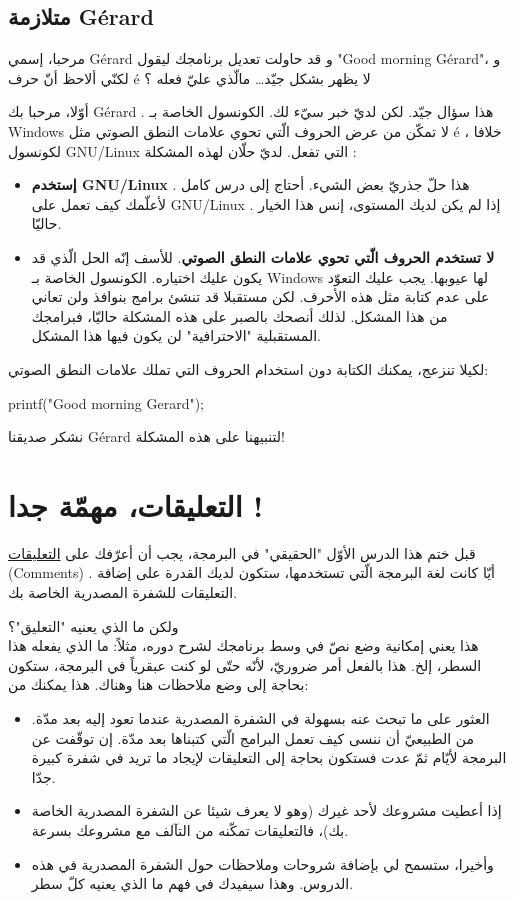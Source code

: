 \subsection{متلازمة \textenglish{Gérard}}
\begin{question}
  مرحبا، إسمي
\textenglish{Gérard}
و قد حاولت تعديل برنامجك ليقول
"\textenglish{Good morning Gérard}"،
و لكنّي ألاحظ أنّ حرف
\textenglish{é}
 لا يظهر بشكل جيّد… مالّذي عليّ فعله ؟
\end{question}
أوّلا، مرحبا بك
\textenglish{Gérard}
. هذا سؤال جيّد. لكن لديّ خبر سيّء لك. الكونسول الخاصة بـ
\textenglish{Windows}
لا تمكّن من عرض الحروف الّتي تحوي علامات النطق الصوتي مثل
\textenglish{é}
، خلافا لكونسول
\textenglish{GNU/Linux}
التي تفعل. لديّ حلّان لهذه المشكلة :
\begin{itemize}
  \item \textbf{إستخدم
\textenglish{GNU/Linux}}
. هذا حلّ جذريّ بعض الشيء. أحتاج إلى درس كامل لأعلّمك كيف تعمل على
\textenglish{GNU/Linux}
. إذا لم يكن لديك المستوى، إنس هذا الخيار حاليّا.
  \item \textbf{لا تستخدم الحروف الّتي تحوي علامات النطق الصوتي}.
للأسف إنّه الحل الّذي قد يكون عليك اختياره. الكونسول الخاصة بـ
\textenglish{Windows}
لها عيوبها. يجب عليك التعوّد على عدم كتابة مثل هذه الأحرف. لكن مستقبلا قد تنشئ برامج بنوافذ ولن تعاني من هذا المشكل. لذلك أنصحك بالصبر على هذه المشكلة حاليّا، فبرامجك المستقبلية "الاحترافية" لن يكون فيها هذا المشكل.
\end{itemize}

لكيلا تنزعج، يمكنك الكتابة دون استخدام الحروف التي تملك علامات النطق الصوتي:
\begin{Csource}
printf("Good morning Gerard\n");
\end{Csource}
نشكر صديقنا
\textenglish{Gérard}
لتنبيهنا على هذه المشكلة!

\section{التعليقات، مهمّة جدا !}
قبل ختم هذا الدرس الأوّل "الحقيقي" في البرمجة، يجب أن أعرّفك على
\underline{التعليقات}
(\textenglish{Comments})
. أيّا كانت لغة البرمجة الّتي تستخدمها، ستكون لديك القدرة على إضافة التعليقات للشفرة المصدرية الخاصة بك.

ولكن ما الذي يعنيه "التعليق"؟\\
هذا يعني إمكانية وضع نصّ في وسط برنامجك لشرح دوره، مثلاً: ما الذي يفعله هذا السطر، إلخ. هذا بالفعل أمر ضروريّ، لأنّه حتّى لو كنت عبقرياً في البرمجة، ستكون بحاجة إلى وضع ملاحظات هنا وهناك. هذا يمكنك من:
\begin{itemize}
  \item العثور على ما تبحث عنه بسهولة في الشفرة المصدرية عندما تعود إليه بعد مدّة. من الطبيعيّ أن ننسى كيف تعمل البرامج الّتي كتبناها بعد مدّة. إن توقّفت عن البرمجة لأيّام ثمّ عدت فستكون بحاجة إلى التعليقات لإيجاد ما تريد في شفرة كبيرة جدّا.
  \item إذا أعطيت مشروعك لأحد غيرك (وهو لا يعرف شيئا عن الشفرة المصدرية الخاصة بك)، فالتعليقات تمكّنه من التآلف مع مشروعك بسرعة.
  \item وأخيرا، ستسمح لي بإضافة شروحات وملاحظات حول الشفرة المصدرية في هذه الدروس. وهذا سيفيدك في فهم ما الذي يعنيه كلّ سطر.
\end{itemize}

